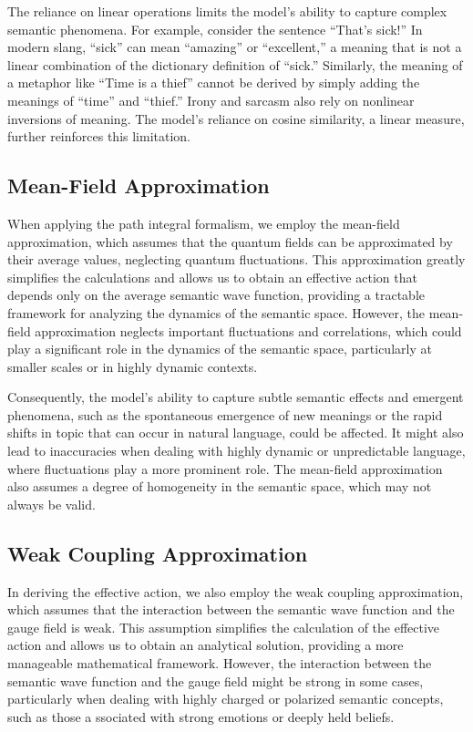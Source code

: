 \documentclass[prd,amsmath,amssymb,12pt]{revtex4}
\begin{document}
The reliance on linear operations limits the model's ability to capture complex
semantic phenomena. For example, consider the sentence ``That's sick!'' In modern
slang, ``sick'' can mean ``amazing'' or ``excellent,'' a meaning that is not a linear
combination of the dictionary definition of ``sick.'' Similarly, the meaning of a
metaphor like ``Time is a thief'' cannot be derived by simply adding the meanings
of ``time'' and ``thief.'' Irony and sarcasm also rely on nonlinear inversions of
meaning. The model's reliance on cosine similarity, a linear measure, further
reinforces this limitation.


\subsection{Mean-Field Approximation}

When applying the path integral formalism, we employ the mean-field approximation,
which assumes that the quantum fields can be approximated by their average values,
neglecting quantum fluctuations. This approximation greatly simplifies the
calculations and allows us to obtain an effective action that depends only
on the average semantic wave function, providing a tractable framework for
analyzing the dynamics of the semantic space. However, the mean-field approximation
neglects important fluctuations and correlations, which could play a significant
role in the dynamics of the semantic space, particularly at smaller scales
or in highly dynamic contexts.

Consequently, the model's ability to capture subtle semantic effects and
emergent phenomena, such as the spontaneous emergence of new meanings
or the rapid shifts in topic that can occur in natural language, could
be affected. It might also
lead to inaccuracies when dealing with highly dynamic or unpredictable language,
where fluctuations play a more prominent role. The mean-field approximation
also assumes a degree of homogeneity in the semantic space, which may not
always be valid.


\subsection{Weak Coupling Approximation}

In deriving the effective action, we also employ the weak coupling approximation,
which assumes that the interaction between the semantic wave function and the
gauge field is weak. This assumption simplifies the calculation of the effective
action and allows us to obtain an analytical solution, providing a more manageable
mathematical framework. However, the interaction between the semantic wave
function and the gauge field might be strong in some cases, particularly when
dealing with highly charged or polarized semantic concepts, such as those a
ssociated with strong emotions or deeply held beliefs.
\end{document}
